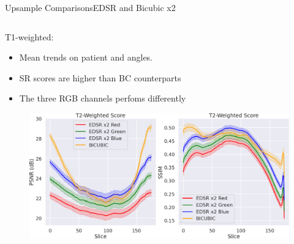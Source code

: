 \documentclass[10pt, unicode]{beamer}
\begin{document}
% 
% 
% 


\begin{frame}{Upsample Comparisons}{EDSR and Bicubic x2}
  \small
    \begin{columns}
    \begin{column}{0.5\textwidth}
      T1-weighted: 
      \begin{itemize}
        \item Mean trends on patient and angles.
        \item SR scores are higher than BC counterparts
        \item The three RGB channels perfoms differently
      \end{itemize}
      \begin{figure}
        \vspace{-0.3cm}
        \includegraphics[scale=0.14]{./images/EDSR_score_slide_t2_all.png}
      \end{figure}
    \end{column}


\end{columns}
\end{frame}
\end{document}
